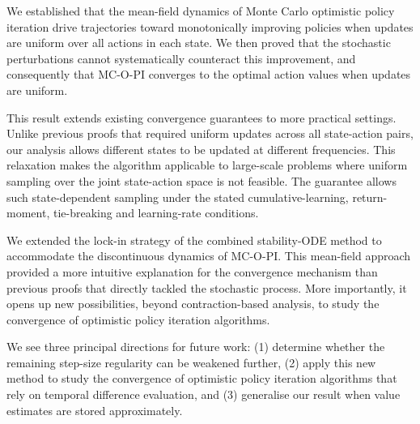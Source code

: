We established that the mean-field dynamics of Monte Carlo optimistic policy iteration drive trajectories toward monotonically improving policies when updates are uniform over all actions in each state. 
We then proved that the stochastic perturbations cannot systematically counteract this improvement,
and consequently that MC-O-PI converges to the optimal action values when updates are uniform.


%
This result extends existing convergence guarantees to more practical settings. Unlike previous proofs that required uniform updates across all state-action pairs, our analysis allows different states to be updated at different frequencies.
This relaxation makes the algorithm applicable to large-scale problems where uniform sampling over the joint state-action space is not feasible.
The guarantee allows such state-dependent sampling under the stated cumulative-learning, return-moment, tie-breaking and learning-rate conditions.
%
%


%
We extended the lock-in strategy of the combined stability-ODE method to accommodate the discontinuous dynamics of MC-O-PI.
This mean-field approach provided a more intuitive explanation for the convergence mechanism than previous proofs that directly tackled the stochastic process.
More importantly, it opens up new possibilities, beyond contraction-based analysis, to study the convergence of optimistic policy iteration algorithms.


%
We see three principal directions for future work:
(1) determine whether the remaining step-size regularity can be weakened further,
%
(2) apply this new method to study the convergence of optimistic policy iteration algorithms that rely on temporal difference evaluation,
and (3) generalise our result when value estimates are stored approximately.



%
%

%
%
%
%


%
%
%
%


%


%
%
%
%
%
%
%
%



\clearpage
